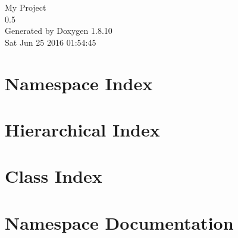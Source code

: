 \documentclass[twoside]{book}
\newcommand{\+}{\discretionary{\mbox{\scriptsize$\hookleftarrow$}}{}{}}
\newcommand{\clearemptydoublepage}{%
  \newpage{\pagestyle{empty}\cleardoublepage}%
}
\begin{document}
\hypersetup{pageanchor=false,
             bookmarks=true,
             bookmarksnumbered=true,
             pdfencoding=unicode
            }
\begin{titlepage}
\vspace*{7cm}
\begin{center}%
{\Large My Project \\[1ex]\large 0.\+5 }\\
\vspace*{1cm}
{\large Generated by Doxygen 1.8.10}\\
\vspace*{0.5cm}
{\small Sat Jun 25 2016 01:54:45}\\
\end{center}
\end{titlepage}
\clearemptydoublepage
\tableofcontents
\clearemptydoublepage
{}
\hypersetup{pageanchor=true}

\chapter{Namespace Index}

\chapter{Hierarchical Index}

\chapter{Class Index}

\chapter{Namespace Documentation}





\end{document}
